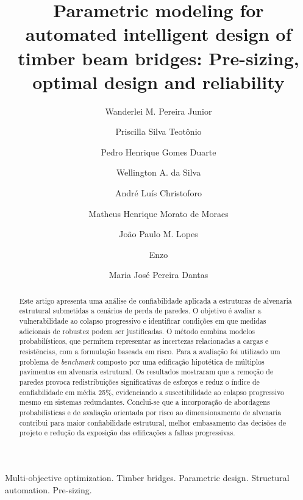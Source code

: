 \documentclass[preprint,11pt]{elsarticle}
\theoremstyle{plain}
\theoremstyle{definition}
\theoremstyle{remark}
\begin{document}
\begin{frontmatter}

\title{Parametric modeling for automated intelligent design of timber beam bridges: Pre-sizing, optimal design and reliability}

\author[label1]{Wanderlei M. Pereira Junior}
\author[label1]{Priscilla Silva Teotônio}
\author[label1]{Pedro Henrique Gomes Duarte}
\author[label1]{Wellington A. da Silva}
\author[label3]{André Luís Christoforo}
\author[label4]{Matheus Henrique Morato de Moraes}
\author[label1]{João Paulo M. Lopes}
\author[label1]{Enzo}
\author[label1]{Maria José Pereira Dantas}
\address[label1]{Faculdade de Engenharia, Universidade Federal de Catalão, Catalão 75705-220, Goiás, Brasil}
\address[label2]{Escola de Engenharia de São Carlos, Universidade de São Paulo, São Carlos 13566-590, São Paulo, Brasil}
\address[label3]{Departamento de Engenharia Civil, Universidade Federal de São Carlos 13565-905, São Paulo, Brasil}
\address[label4]{Faculdade de Ciências e Tecnologia, Universidade Federal de Goiás 74971-451, Goiás, Brasil}


\makeatletter
\renewcommand\abstractname{Resumo}
\makeatother

\begin{abstract}
Este artigo apresenta uma análise de confiabilidade aplicada a estruturas de alvenaria estrutural submetidas a cenários de perda de paredes. O objetivo é avaliar a vulnerabilidade ao colapso progressivo e identificar condições em que medidas adicionais de robustez podem ser justificadas. O método combina modelos probabilísticos, que permitem representar as incertezas relacionadas a cargas e resistências, com a formulação baseada em risco. Para a avaliação foi utilizado um problema de \textit{benchmark} composto por uma edificação hipotética de múltiplos pavimentos em alvenaria estrutural. Os resultados mostraram que a remoção de paredes provoca redistribuições significativas de esforços e reduz o índice de confiabilidade em média 25\%, evidenciando a suscetibilidade ao colapso progressivo mesmo em sistemas redundantes. Conclui-se que a incorporação de abordagens probabilísticas e de avaliação orientada por risco ao dimensionamento de alvenaria contribui para maior confiabilidade estrutural, melhor embasamento das decisões de projeto e redução da exposição das edificações a falhas progressivas.
\end{abstract}

\begin{keyword}
Multi-objective optimization. Timber bridges. Parametric design. Structural automation. Pre-sizing.
\end{keyword}

\end{frontmatter}
\end{document}
